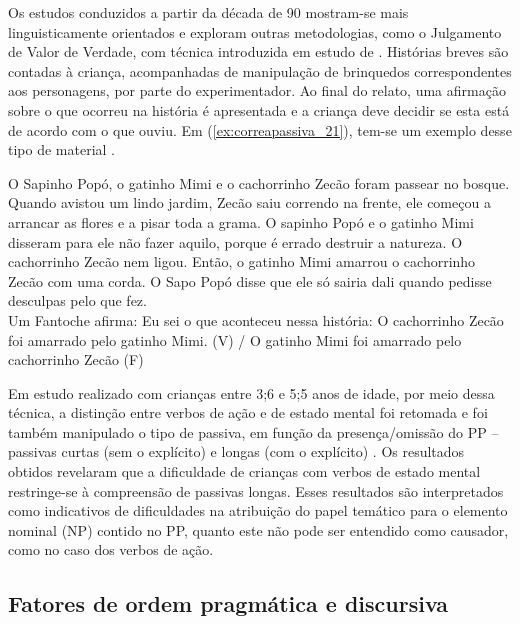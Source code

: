 \documentclass[output=paper]{LSP/langsci}
\begin{document}
Os estudos conduzidos a partir da década de 90 mostram-se mais linguisticamente orientados e exploram outras metodologias, como o Julgamento de Valor de Verdade, com técnica introduzida em estudo de \citet{crain_mckee1985}. Histórias breves são contadas à criança, acompanhadas de manipulação de brinquedos correspondentes aos personagens, por parte do experimentador. Ao final do relato, uma afirmação sobre o que ocorreu na história é apresentada e a criança deve decidir se esta está de acordo com o que ouviu. Em (\ref{ex:correapassiva_21}), tem-se um exemplo desse tipo de material \citep{limajunior2012}. 

\ea\label{ex:correapassiva_21}
O Sapinho Popó, o gatinho Mimi e o cachorrinho Zecão foram passear no bosque. Quando avistou um lindo jardim, Zecão saiu correndo na frente, ele começou a arrancar as flores e a pisar toda a grama. O sapinho Popó e o gatinho Mimi disseram para ele não fazer aquilo, porque é errado destruir a natureza. O cachorrinho Zecão nem ligou. Então, o gatinho Mimi amarrou o cachorrinho Zecão com uma corda. O Sapo Popó disse que ele só sairia dali quando pedisse desculpas pelo que fez.\\
Um Fantoche afirma: Eu sei o que aconteceu nessa história: O cachorrinho Zecão foi amarrado pelo gatinho Mimi. (V) / O gatinho Mimi foi amarrado pelo cachorrinho Zecão (F) 
\z

Em estudo realizado com crianças entre 3;6 e 5;5 anos de idade, por meio dessa técnica, a distinção entre verbos de ação e de estado mental foi retomada e foi também manipulado o tipo de passiva, em função da presença/omissão do PP – passivas curtas (sem o  explícito) e longas (com o  explícito) \citep{foxgrodzinsky1998}. Os resultados obtidos revelaram que a dificuldade de crianças com verbos de estado mental restringe-se à compreensão de passivas longas. Esses resultados são interpretados como indicativos de dificuldades na atribuição do papel temático para o elemento nominal (NP) contido no PP, quanto este não pode ser entendido como causador, como no caso dos verbos de ação.

\subsection{Fatores de ordem pragmática e discursiva}
\label{subsec:correapassiva_fatores_prag_disc}
\end{document}
